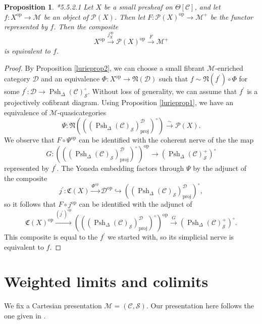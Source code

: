 \documentclass{amsart}
\numberwithin{equation}{section}
\theoremstyle{plain}   %
\newtheorem{prop}[subsection]{Proposition}
\theoremstyle{remark}
\theoremstyle{plain}
\DeclareMathOperator{\Psh}{Psh}
\newcommand{\op}{\ensuremath{\mathrm{op}}}
\newcommand{\C}{\ensuremath{\mathcal{C}}}
\newcommand{\M}{\ensuremath{\mathcal{M}}}
\newcommand{\Pre}{\ensuremath{\mathcal{P}}}
\newcommand{\setS}{\ensuremath{\mathscr{S}}}
\begin{document}
\begin{prop}\cite{htt}*{5.5.2.1}
	Let \(X\) be a small presheaf on \(\Theta[\C]\), and let \(f: X^\op \to \M\) be an object of \(\Pre(X)\).  Then let \(F:\Pre(X)^\op \to \M^+\) be the functor represented by \(f\).  Then the composite \[X^\op\xrightarrow{j^\op_X} \Pre(X)^\op \xrightarrow{F} \M^+\] is equivalent to \(f\).
\end{prop}
\begin{proof}
	By Proposition \ref{lurieprop2}, we can choose a small fibrant \(\M\)-enriched category \(\mathcal{D}\) and an equivalence \(\Phi:X^\op\to \mathfrak{N}(\mathcal{D})\) such that \(f\sim \mathfrak{N}(f^\prime) \circ \Phi\) for some \(f^\prime:\mathcal{D} \to \Psh_\Delta(\C)_\setS^\circ\).  Without loss of generality, we can assume that \(f^\prime\) is a projectively cofibrant diagram.  Using Proposition \ref{lurieprop1}, we have an equivalence of \(\M\)-quasicategories 
	\[\Psi:\mathfrak{N}\left(\left((\Psh_\Delta(\C)_\setS)_\mathrm{proj}^\mathcal{D}\right)^\circ\right) \xrightarrow{\sim} \Pre(X).\] 
	We observe that \(F\circ \Psi^\op\) can be identified with the coherent nerve of the the map 
	\[G: \left(\left((\Psh_\Delta(\C)_\setS)_\mathrm{proj}^\mathcal{D}\right)^\circ\right)^\op \to \left(\Psh_\Delta(\C)^{+}_\setS\right)^\circ\] represented by \(f^\prime\).  The Yoneda embedding factors through \(\Psi\) by the adjunct of the composite 
	\[j^\prime:\mathfrak{C}(X)\xrightarrow{\Phi^\op} \mathcal{D}^\op \hookrightarrow \left((\Psh_\Delta(\C)_\setS)_\mathrm{proj}^\mathcal{D}\right)^\circ,\]
	so it follows that \(F\circ j^\op\) can be identified with the adjunct of 
	\[\mathfrak{C}(X)^\op \xrightarrow{(j^\prime)^\op} \left(\left((\Psh_\Delta(\C)_\setS)_\mathrm{proj}^\mathcal{D}\right)^\circ\right)^\op \xrightarrow{G} \left(\Psh_\Delta(\C)^{+}_\setS\right)^\circ.\]
	This composite is equal to the \(f^\prime\) we started with, so its simplicial nerve is equivalent to \(f\).
\end{proof}

\section{Weighted limits and colimits}
We fix a Cartesian presentation \(\M=(\C,\setS)\).  Our presentation here follows the one given in \cite{nlabwlim}.
\end{document}
